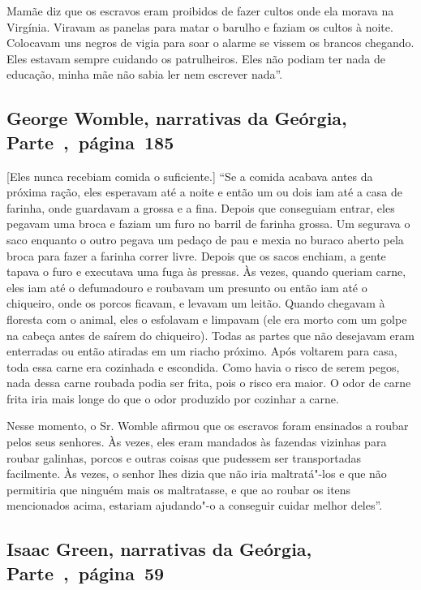 Mamãe diz que os escravos eram proibidos de fazer cultos onde ela morava
na Virgínia. Viravam as panelas para matar o barulho e faziam os cultos
à noite. Colocavam uns negros de vigia para soar o alarme se vissem os
brancos chegando. Eles estavam sempre cuidando os patrulheiros. Eles não
podiam ter nada de educação, minha mãe não sabia ler nem escrever
nada''.

\subsection{George Womble, narrativas da Geórgia, Parte~,~página~185}
\label{ref310}

{[}Eles nunca recebiam comida o suficiente.{]} ``Se a comida acabava
antes da próxima ração, eles esperavam até a noite e então um ou dois
iam até a casa de farinha, onde guardavam a grossa e a fina. Depois que
conseguiam entrar, eles pegavam uma broca e faziam um furo no barril de
farinha grossa. Um segurava o saco enquanto o outro pegava um pedaço de
pau e mexia no buraco aberto pela broca para fazer a farinha correr
livre. Depois que os sacos enchiam, a gente tapava o furo e executava
uma fuga às pressas. Às vezes, quando queriam carne, eles iam até o
defumadouro e roubavam um presunto ou então iam até o chiqueiro, onde os
porcos ficavam, e levavam um leitão. Quando chegavam à floresta com o
animal, eles o esfolavam e limpavam (ele era morto com um golpe na
cabeça antes de saírem do chiqueiro). Todas as partes que não desejavam
eram enterradas ou então atiradas em um riacho próximo. Após voltarem
para casa, toda essa carne era cozinhada e escondida. Como havia o risco
de serem pegos, nada dessa carne roubada podia ser frita, pois o risco
era maior. O odor de carne frita iria mais longe do que o odor produzido
por cozinhar a carne.

Nesse momento, o Sr. Womble afirmou que os escravos foram ensinados a
roubar pelos seus senhores. Às vezes, eles eram mandados às fazendas
vizinhas para roubar galinhas, porcos e outras coisas que pudessem ser
transportadas facilmente. Às vezes, o senhor lhes dizia que não iria
maltratá"-los e que não permitiria que ninguém mais os maltratasse, e que
ao roubar os itens mencionados acima, estariam ajudando"-o a conseguir
cuidar melhor deles''.

\subsection{Isaac Green, narrativas da Geórgia, Parte~,~página~59}
\label{ref113}

